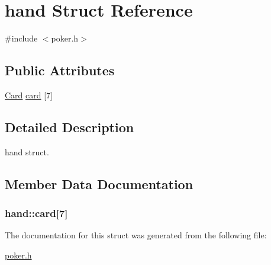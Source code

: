 \hypertarget{structhand}{\section{hand Struct Reference}
\label{structhand}
}


{\ttfamily \#include $<$poker.\+h$>$}

\subsection*{Public Attributes}
\begin{DoxyCompactItemize}
\item 
\hyperlink{poker_8h_aacb186b77382a02f7317dc38797f37c2}{Card} \hyperlink{structhand_a870281c3dc3c9faf5ee6dd3345aa949e}{card} \mbox{[}7\mbox{]}
\end{DoxyCompactItemize}


\subsection{Detailed Description}
hand struct. 

\subsection{Member Data Documentation}
\hypertarget{structhand_a870281c3dc3c9faf5ee6dd3345aa949e}{
\subsubsection[{card}]{ hand\+::card\mbox{[}7\mbox{]}}}\label{structhand_a870281c3dc3c9faf5ee6dd3345aa949e}


The documentation for this struct was generated from the following file\+:\begin{DoxyCompactItemize}
\item 
\hyperlink{poker_8h}{poker.\+h}\end{DoxyCompactItemize}
